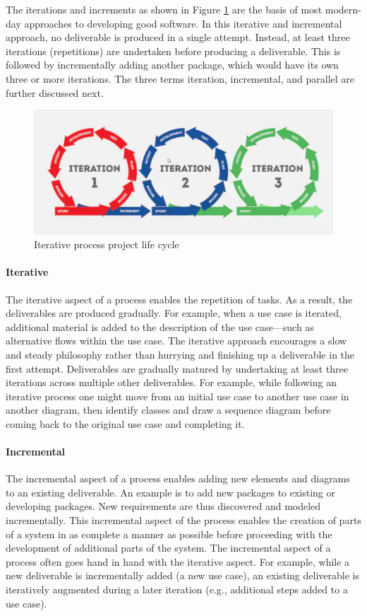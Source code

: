 The iterations and increments as shown in Figure \ref{fig:iterationlifecycle} are the basis of most modern-day approaches to developing good software. In this iterative and incremental approach, no deliverable is produced in a single attempt. Instead, at least three iterations (repetitions) are undertaken before producing a deliverable.
This is followed by incrementally adding another package, which would have its own three or more iterations. The three terms iteration, incremental, and parallel are further discussed next.
\begin{figure}[!ht]
      \center
      \includegraphics[scale=0.40]{assets/iteration.png}
      \caption{Iterative process project life cycle}
      \label{fig:iterationlifecycle}
\end{figure}
\paragraph*{Iterative}
The iterative aspect of a process enables the repetition of tasks. As a result, the deliverables are produced gradually. For example, when a use case is iterated, additional material is added to the description of the use case—such as alternative flows within the use case. The iterative approach encourages a slow and steady philosophy rather than hurrying and finishing up a deliverable in the first attempt.
Deliverables are gradually matured by undertaking at least three iterations across multiple other deliverables. For example, while following an iterative process one might move from an initial use case to another use case in another diagram, then identify classes and draw a sequence diagram before coming back to the original use case and completing it.
\paragraph*{Incremental}
The incremental aspect of a process enables adding new elements and diagrams to an existing deliverable. An example is to add new packages to existing or developing packages. New requirements are thus discovered and modeled incrementally. This incremental aspect of the process enables the creation of parts of a system in as complete a manner as possible before proceeding with the development of additional parts of the system. The incremental aspect of a process often goes hand in hand with the iterative aspect. For example, while a new deliverable is incrementally added (a new use case), an existing deliverable is iteratively augmented during a later iteration (e.g., additional steps added to a use case).
\clearpage
